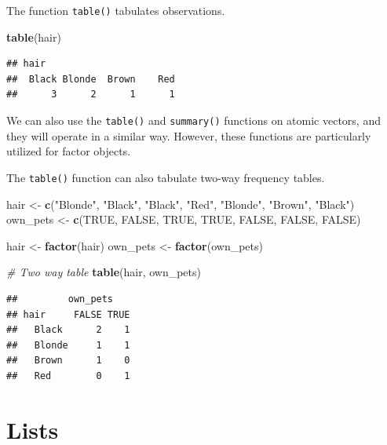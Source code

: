 \documentclass[
]{book}
\newenvironment{Shaded}{\begin{snugshade}}{\end{snugshade}}
\newcommand{\CommentTok}[1]{\textcolor[rgb]{0.56,0.35,0.01}{\textit{#1}}}
\newcommand{\KeywordTok}[1]{\textcolor[rgb]{0.13,0.29,0.53}{\textbf{#1}}}
\newcommand{\NormalTok}[1]{#1}
\newcommand{\OtherTok}[1]{\textcolor[rgb]{0.56,0.35,0.01}{#1}}
\newcommand{\StringTok}[1]{\textcolor[rgb]{0.31,0.60,0.02}{#1}}
\begin{document}
The function \texttt{table()} tabulates observations.

\begin{Shaded}
\begin{Highlighting}[]
\KeywordTok{table}\NormalTok{(hair)}
\end{Highlighting}
\end{Shaded}

\begin{verbatim}
## hair
##  Black Blonde  Brown    Red 
##      3      2      1      1
\end{verbatim}

We can also use the \texttt{table()} and \texttt{summary()} functions on atomic vectors, and they will operate in a similar way. However, these functions are particularly utilized for factor objects.

The \texttt{table()} function can also tabulate two-way frequency tables.

\begin{Shaded}
\begin{Highlighting}[]
\NormalTok{hair <-}\StringTok{ }\KeywordTok{c}\NormalTok{(}\StringTok{"Blonde"}\NormalTok{, }\StringTok{"Black"}\NormalTok{, }\StringTok{"Black"}\NormalTok{, }\StringTok{"Red"}\NormalTok{, }\StringTok{"Blonde"}\NormalTok{, }\StringTok{"Brown"}\NormalTok{,}
    \StringTok{"Black"}\NormalTok{)}
\NormalTok{own_pets <-}\StringTok{ }\KeywordTok{c}\NormalTok{(}\OtherTok{TRUE}\NormalTok{, }\OtherTok{FALSE}\NormalTok{, }\OtherTok{TRUE}\NormalTok{, }\OtherTok{TRUE}\NormalTok{, }\OtherTok{FALSE}\NormalTok{, }\OtherTok{FALSE}\NormalTok{, }\OtherTok{FALSE}\NormalTok{)}

\NormalTok{hair <-}\StringTok{ }\KeywordTok{factor}\NormalTok{(hair)}
\NormalTok{own_pets <-}\StringTok{ }\KeywordTok{factor}\NormalTok{(own_pets)}


\CommentTok{# Two way table}
\KeywordTok{table}\NormalTok{(hair, own_pets)}
\end{Highlighting}
\end{Shaded}

\begin{verbatim}
##         own_pets
## hair     FALSE TRUE
##   Black      2    1
##   Blonde     1    1
##   Brown      1    0
##   Red        0    1
\end{verbatim}

\hypertarget{lists}{%
\section{Lists}\label{lists}}
\end{document}
